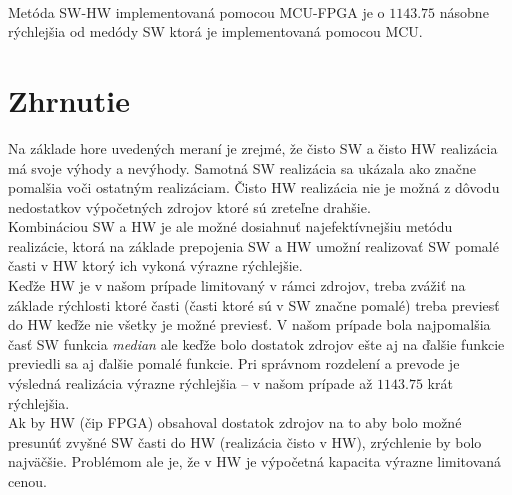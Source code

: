 \documentclass[11pt,a4paper]{article}
\begin{document}
\hfill\\[-3em]

Metóda SW-HW implementovaná pomocou MCU-FPGA je o $1143.75$ násobne rýchlejšia od medódy SW ktorá je implementovaná pomocou MCU.

\section{Zhrnutie}

Na základe hore uvedených meraní je zrejmé, že čisto SW a čisto HW realizácia má svoje výhody a nevýhody. Samotná SW realizácia sa ukázala ako značne pomalšia voči ostatným realizáciam. Čisto HW realizácia nie je možná z dôvodu nedostatkov výpočetných zdrojov ktoré sú zreteľne drahšie.\\

Kombináciou SW a HW je ale možné dosiahnuť najefektívnejšiu metódu realizácie, ktorá na základe prepojenia SW a HW umožní realizovať SW pomalé časti v HW ktorý ich vykoná výrazne rýchlejšie.\\

Keďže HW je v našom prípade limitovaný v rámci zdrojov, treba zvážiť na základe rýchlosti ktoré časti (časti ktoré sú v SW značne pomalé) treba previesť do HW keďže nie všetky je možné previesť. V našom prípade bola najpomalšia časť SW funkcia \textit{median} ale keďže bolo dostatok zdrojov ešte aj na ďalšie funkcie previedli sa aj ďalšie pomalé funkcie. Pri správnom rozdelení a prevode je výsledná realizácia výrazne rýchlejšia -- v našom prípade až $1143.75$ krát rýchlejšia.\\

Ak by HW (čip FPGA) obsahoval dostatok zdrojov na to aby bolo možné presunúť zvyšné SW časti do HW (realizácia čisto v HW), zrýchlenie by bolo najväčšie. Problémom ale je, že v HW je výpočetná kapacita výrazne limitovaná cenou.

%
%    
\end{document}
